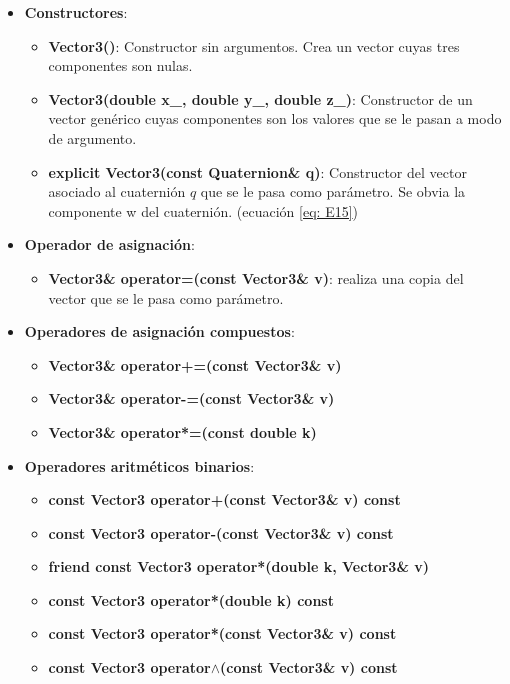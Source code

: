 \documentclass[12pt, a4paper]{report}
\begin{document}
\begin{itemize}

\item \textbf{Constructores}:

\begin{itemize}
\item \textbf{Vector3()}: Constructor sin argumentos. Crea un vector cuyas tres componentes son nulas.

\item \textbf{Vector3(double x\_, double y\_, double z\_)}: Constructor de un vector genérico cuyas componentes son los valores que se le pasan a modo de argumento.

\item \textbf{explicit Vector3(const Quaternion\& q)}: Constructor del vector asociado al cuaternión $q$ que se le pasa como parámetro. Se obvia la componente w del cuaternión. (ecuación \eqref{eq: E15})
\end{itemize}

\item \textbf{Operador de asignación}:

\begin{itemize}
\item \textbf{Vector3\& operator=(const Vector3\& v)}: realiza una copia del vector que se le pasa como parámetro.
\end{itemize} 

\item \textbf{Operadores de asignación compuestos}:

\begin{itemize}
\item \textbf{Vector3\& operator+=(const Vector3\& v)}
\item \textbf{Vector3\& operator-=(const Vector3\& v)}
\item \textbf{Vector3\& operator*=(const double k)}
\end{itemize}

\item \textbf{Operadores aritméticos binarios}:

\begin{itemize}
\item \textbf{const Vector3 operator+(const Vector3\& v) const}
\item \textbf{const Vector3 operator-(const Vector3\& v) const}
\item \textbf{friend const Vector3 operator*(double k, Vector3\& v)}
\item \textbf{const Vector3 operator*(double k) const}
\item \textbf{const Vector3 operator*(const Vector3\& v) const}
\item \textbf{const Vector3 operator$\wedge$(const Vector3\& v) const}
\end{itemize}


\end{itemize}
\end{document}
